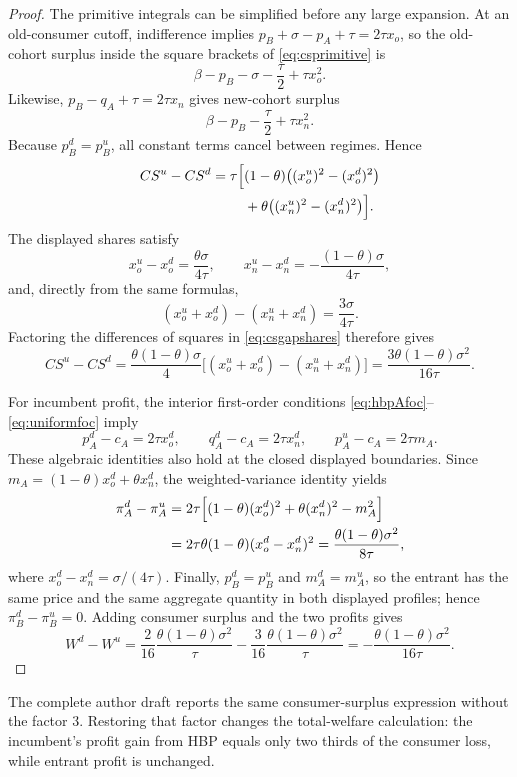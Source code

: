 \documentclass[11pt]{article}
\begin{document}
\begin{proof}
The primitive integrals can be simplified before any large expansion.  At an
old-consumer cutoff, indifference implies
$p_B+\sigma-p_A+\tau=2\tau x_o$, so the old-cohort surplus inside the square
brackets of \eqref{eq:csprimitive} is
\[
 \beta-p_B-\sigma-\frac{\tau}{2}+\tau x_o^2.
\]
Likewise, $p_B-q_A+\tau=2\tau x_n$ gives new-cohort surplus
\[
 \beta-p_B-\frac{\tau}{2}+\tau x_n^2.
\]
Because $p_B^d=p_B^u$, all constant terms cancel between regimes.  Hence
\begin{align}
 CS^u-CS^d
 =\tau\Bigl[
 &(1-\theta)\bigl((x_o^u)^2-(x_o^d)^2\bigr) \\
 &+\theta\bigl((x_n^u)^2-(x_n^d)^2\bigr)
 \Bigr].
 \label{eq:csgapshares}
\end{align}
The displayed shares satisfy
\[
 x_o^u-x_o^d=\frac{\theta\sigma}{4\tau},
 \qquad
 x_n^u-x_n^d=-\frac{(1-\theta)\sigma}{4\tau},
\]
and, directly from the same formulas,
\[
 (x_o^u+x_o^d)-(x_n^u+x_n^d)=\frac{3\sigma}{4\tau}.
\]
Factoring the differences of squares in \eqref{eq:csgapshares} therefore gives
\[
 CS^u-CS^d
 =\frac{\theta(1-\theta)\sigma}{4}
   \bigl[(x_o^u+x_o^d)-(x_n^u+x_n^d)\bigr]
 =\frac{3\theta(1-\theta)\sigma^2}{16\tau}.
\]

For incumbent profit, the interior first-order conditions
\eqref{eq:hbpAfoc}--\eqref{eq:uniformfoc} imply
\[
 p_A^d-c_A=2\tau x_o^d,\qquad
 q_A^d-c_A=2\tau x_n^d,\qquad
 p_A^u-c_A=2\tau m_A.
\]
These algebraic identities also hold at the closed displayed boundaries.  Since
$m_A=(1-\theta)x_o^d+\theta x_n^d$, the weighted-variance identity yields
\begin{align}
 \pi_A^d-\pi_A^u
 &=2\tau\Bigl[
 (1-\theta)(x_o^d)^2+\theta(x_n^d)^2-m_A^2
 \Bigr]\\
 &=2\tau\theta(1-\theta)(x_o^d-x_n^d)^2
 =\frac{\theta(1-\theta)\sigma^2}{8\tau},
\end{align}
where $x_o^d-x_n^d=\sigma/(4\tau)$.  Finally,
$p_B^d=p_B^u$ and $m_A^d=m_A^u$, so the entrant has the same price and the same
aggregate quantity in both displayed profiles; hence
$\pi_B^d-\pi_B^u=0$.  Adding consumer surplus and the two profits gives
\[
 W^d-W^u
 =\frac{2}{16}\frac{\theta(1-\theta)\sigma^2}{\tau}
  -\frac{3}{16}\frac{\theta(1-\theta)\sigma^2}{\tau}
 =-\frac{\theta(1-\theta)\sigma^2}{16\tau}.
\]
\end{proof}

The complete author draft reports the same consumer-surplus expression without
the factor $3$. Restoring that factor changes the total-welfare calculation:
the incumbent's profit gain from HBP equals only two thirds of the consumer
loss, while entrant profit is unchanged.
\end{document}

